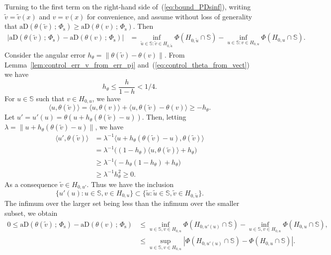 \documentclass{article}
\numberwithin{equation}{section}
\newcommand{\sphere}{\mathbb{S}}
\newcommand{\aD}[2]{{\mathrm{aD}}\left({#1}\,;\,{#2}\right)}
\newcommand{\Phitrad}{\Phi_{\mathrm{s}}} %
\begin{document}
    Turning to the first term on the right-hand side
    of~(\ref{eq:bound_PDsinf}), writing $\tilde v= \tilde  v(x)$ and
    $v=v(x)$ for convenience, and  assume without loss of generality
    that $\aD{\theta(\tilde  v) }{\Phitrad} \ge \aD{\theta( v)
    }{\Phitrad}$. Then
    \begin{align}
        \big|\aD{\theta(\tilde v) }{\Phitrad} - \aD{ \theta(v) }{\Phitrad} \big|
        & = \inf_{\tilde u\in\sphere:  \tilde v\in H_{0,\tilde u}}
        \Phi(H_{0,\tilde u}\cap\sphere)  -
        \inf_{ u\in\sphere:  v\in H_{0,u}} \Phi(H_{0, u}\cap\sphere).  \nonumber
    \end{align}
    Consider the angular error $h_\theta = \|\theta(\tilde v) -
    \theta(v)\|$. From Lemma~\ref{lem:control_err_v_from_err_pj}
    and~(\ref{eq:control_theta_from_vect}) we have
    $$
    h_\theta \le \frac{h}{1-h} < %
    1 / 4.
    $$
    For  $u\in\sphere$ such that $ v\in H_{0,u}$, we have
    $$
    \langle u, \theta(\tilde v) \rangle  = \langle u, \theta( v) \rangle +
    \langle u, \theta(\tilde v) - \theta( v) \rangle \ge - h_\theta.
    $$
    Let %
    $u' =  u'(u) =   \theta(u + h_\theta(\theta(\tilde v)-u))$. Then, letting
    $\lambda = \|u + h_\theta( \theta(\tilde v) -u) \|$, we have
    \begin{align*}
        \langle u', \theta(\tilde v) \rangle
        & = \lambda^{-1} \langle u + h_\theta( \theta(\tilde v)-u),
        \theta(\tilde v) \rangle \\
        & = \lambda^{-1}
        \Big((1-h_\theta) \langle u , \theta(\tilde v)\rangle  +
        h_\theta  \Big)\\
        &\ge  \lambda^{-1} \Big( -h_\theta(1-h_\theta) + h_\theta\Big) \\
        & \ge \lambda^{-1} h_\theta^2 \ge 0.
    \end{align*}
    As a consequence $\tilde v \in H_{0,u'}$. Thus we have the inclusion
    $$
    \{ u'(u): u\in\sphere,  v \in H_{0,u} \} \subset
    \{  \tilde u : \tilde u \in\sphere, \tilde v \in H_{0,\tilde u} \}.
    $$
    The infimum over the larger set being less than the infimum over
    the smaller subset, we obtain
    \begin{align}
        0\le \aD{\theta(\tilde v) }{\Phitrad} - \aD{ \theta(v) }{\Phitrad}
        & \le \inf_{u\in\sphere,  v \in H_{0,u} }
        \Phi(H_{0,u'(u)}\cap\sphere)  -
        \inf_{u\in\sphere,  v \in H_{0,u} } \Phi(H_{0,u}\cap\sphere),
        \nonumber \\
        & \le \sup_{ u\in\sphere,  v \in H_{0,u} }
        |\Phi(H_{0,u'(u)}\cap\sphere) -
        \Phi(H_{0,u}\cap\sphere)|. \label{eq:controlAD_from_PhiH_0_u}
    \end{align}
\end{document}
